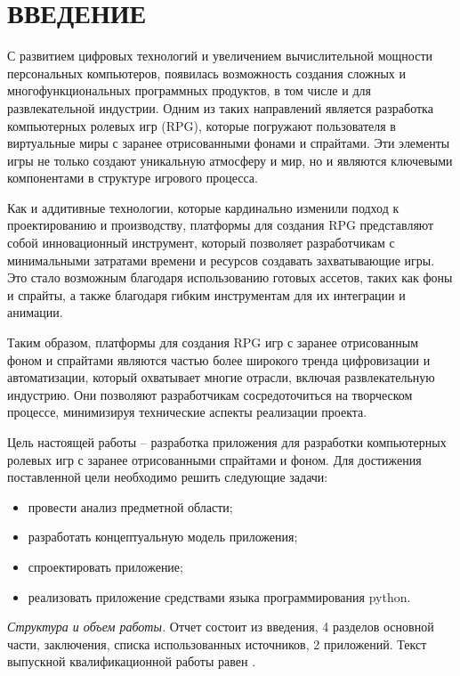 \section*{ВВЕДЕНИЕ}

С развитием цифровых технологий и увеличением вычислительной мощности персональных компьютеров, появилась возможность создания сложных и многофункциональных программных продуктов, в том числе и для развлекательной индустрии. Одним из таких направлений является разработка компьютерных ролевых игр (RPG), которые погружают пользователя в виртуальные миры с заранее отрисованными фонами и спрайтами. Эти элементы игры не только создают уникальную атмосферу и мир, но и являются ключевыми компонентами в структуре игрового процесса.

Как и аддитивные технологии, которые кардинально изменили подход к проектированию и производству, платформы для создания RPG представляют собой инновационный инструмент, который позволяет разработчикам с минимальными затратами времени и ресурсов создавать захватывающие игры. Это стало возможным благодаря использованию готовых ассетов, таких как фоны и спрайты, а также благодаря гибким инструментам для их интеграции и анимации.

Таким образом, платформы для создания RPG игр с заранее отрисованным фоном и спрайтами являются частью более широкого тренда цифровизации и автоматизации, который охватывает многие отрасли, включая развлекательную индустрию. Они позволяют разработчикам сосредоточиться на творческом процессе, минимизируя технические аспекты реализации проекта.

Цель настоящей работы – разработка приложения для разработки компьютерных ролевых игр с заранее отрисованными спрайтами и фоном. Для достижения поставленной цели необходимо решить следующие задачи:
\begin{itemize}
\item провести анализ предметной области;
\item разработать концептуальную модель приложения;
\item спроектировать приложение;
\item реализовать приложение средствами языка программирования python.
\end{itemize}

\emph{Структура и объем работы.} Отчет состоит из введения, 4 разделов основной части, заключения, списка использованных источников, 2 приложений. Текст выпускной квалификационной работы равен .

